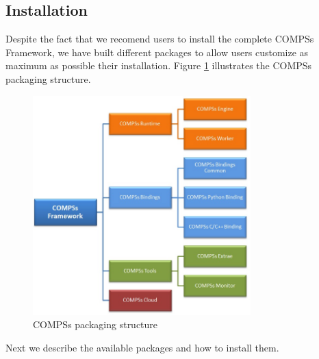 \subsection{Installation}
Despite the fact that we recomend users to install the complete COMPSs Framework, we have built different packages to allow users
customize as maximum as possible their installation. Figure \ref{fig:compss_packages_debian} illustrates the COMPSs packaging structure.
\begin{figure}[ht!]
  \centering
    \includegraphics[width=0.75\textwidth]{./Sections/2_Debian/Figures/compss_packages.jpeg}
    \caption{COMPSs packaging structure}
    \label{fig:compss_packages_debian}
\end{figure}

\newpage
Next we describe the available packages and how to install them. 


